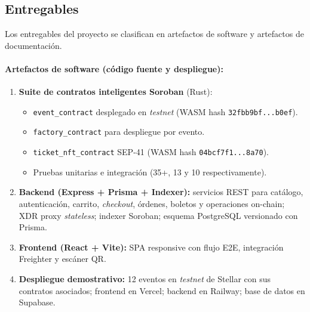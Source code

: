 \documentclass[12pt,oneside]{report}
\begin{document}
    \subsection{Entregables}
    \label{subsec:entregables}
    Los entregables del proyecto se clasifican en artefactos de software y artefactos de documentación.

      \paragraph{Artefactos de software (código fuente y despliegue):}
      \begin{enumerate}
        \item \textbf{Suite de contratos inteligentes Soroban} (Rust):
        \begin{itemize}
          \item \texttt{event\_contract} desplegado en \textit{testnet} (WASM hash \texttt{32fbb9bf...b0ef}).
          \item \texttt{factory\_contract} para despliegue por evento.
          \item \texttt{ticket\_nft\_contract} SEP-41 (WASM hash \texttt{04bcf7f1...8a70}).
          \item Pruebas unitarias e integración (35+, 13 y 10 respectivamente).
        \end{itemize}
        \item \textbf{Backend (Express + Prisma + Indexer):} servicios REST para catálogo, autenticación, carrito, \textit{checkout}, órdenes, boletos y operaciones on-chain; XDR proxy \textit{stateless}; indexer Soroban; esquema PostgreSQL versionado con Prisma.
        \item \textbf{Frontend (React + Vite):} SPA responsive con flujo E2E, integración Freighter y escáner QR.
        \item \textbf{Despliegue demostrativo:} 12 eventos en \textit{testnet} de Stellar con sus contratos asociados; frontend en Vercel; backend en Railway; base de datos en Supabase.
      \end{enumerate}
\end{document}
